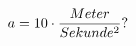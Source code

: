 \documentclass[preview]{standalone}
\begin{document}
\begin{align*}
\special{dvisvgm:raw <g id='unique000'>}a = 10 \cdot \frac{Meter}{Sekunde^{2}} ?\special{dvisvgm:raw </g>}
\end{align*}
\end{document}
